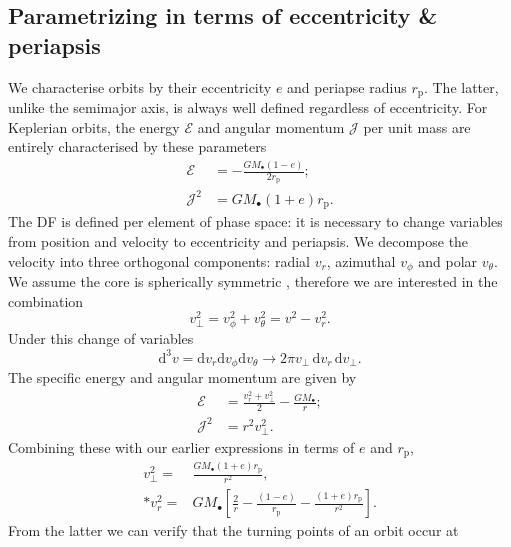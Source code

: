 \documentclass[useAMS,usedcolumn,usegraphicx,usenatbib]{mn2e}
\newcommand{\sub}[1]{\ensuremath{_\mathrm{#1}}}
\newcommand{\dd}{\ensuremath{\mathrm{d}}}
\begin{document}
\subsection{Parametrizing in terms of eccentricity \& periapsis}

We characterise orbits by their eccentricity $e$ and periapse radius $r\sub{p}$. The latter, unlike the semimajor axis, is always well defined regardless of eccentricity. For Keplerian orbits, the energy $\mathcal{E}$ and angular momentum $\mathcal{J}$ per unit mass are entirely characterised by these parameters
\begin{equation}
\label{eq:Energy_ecc}
\begin{split}
\mathcal{E} & = -\frac{GM_\bullet(1 - e)}{2r\sub{p}}; \\
\mathcal{J}^2 & = GM_\bullet(1 + e)r\sub{p}.
\end{split}
\end{equation}
The DF is defined per element of phase space: it is necessary to change variables from position and velocity to eccentricity and periapsis. We decompose the velocity into three orthogonal components: radial $v_r$, azimuthal $v_\phi$ and polar $v_\theta$. We assume the core is spherically symmetric \citep{Genzel2003, Schodel2007}, therefore we are interested in the combination
\begin{equation}
v_\perp^2 = v_\phi^2 + v_\theta^2 = v^2 - v_r^2.
\end{equation}
Under this change of variables
\begin{equation}
\dd^3v = \dd v_r \dd v_\phi \dd v_\theta \rightarrow 2\pi v_\perp \,\dd v_r \,\dd v_\perp.
\end{equation}
The specific energy and angular momentum are given by
\begin{equation}
\begin{split}
\mathcal{E} & = \frac{v_r^2 + v_\perp^2}{2} - \frac{GM_\bullet}{r}; \\
\mathcal{J}^2 & = r^2 v_\perp^2.
\end{split}
\end{equation}
Combining these with our earlier expressions in terms of $e$ and $r\sub{p}$,
\begin{align}
v_\perp^2 = {} & \frac{GM_\bullet(1 + e)r\sub{p}}{r^2}, \\*
v_r^2 = {} & GM_\bullet\left[\frac{2}{r} - \frac{(1 - e)}{r\sub{p}} - \frac{(1 + e)r\sub{p}}{r^2}\right].
\end{align}
From the latter we can verify that the turning points of an orbit occur at
\end{document}
